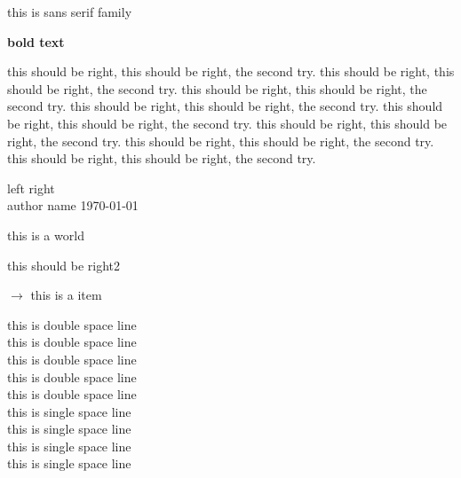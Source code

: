 \documentclass{article}
\begin{document}
\textsf{this is sans serif family}

\begin{center}
    \textbf{bold text}
\end{center}


this should be right, this should be right, the second try.
this should be right, this should be right, the second try.
this should be right, this should be right, the second try.
this should be right, this should be right, the second try.
this should be right, this should be right, the second try.
this should be right, this should be right, the second try.
this should be right, this should be right, the second try.
this should be right, this should be right, the second try.

\noindent left \hfill right \\
\noindent author name \hfill \today

this is a world
\begin{flushright}
    this should be right2
\end{flushright}

$\rightarrow $ this is a item

\noindent
\doublespacing
this is double space line \\
this is double space line \\
this is double space line \\
this is double space line \\
this is double space line \\

\singlespacing
this is single space line \\
this is single space line \\
this is single space line \\
this is single space line \\
\end{document}

